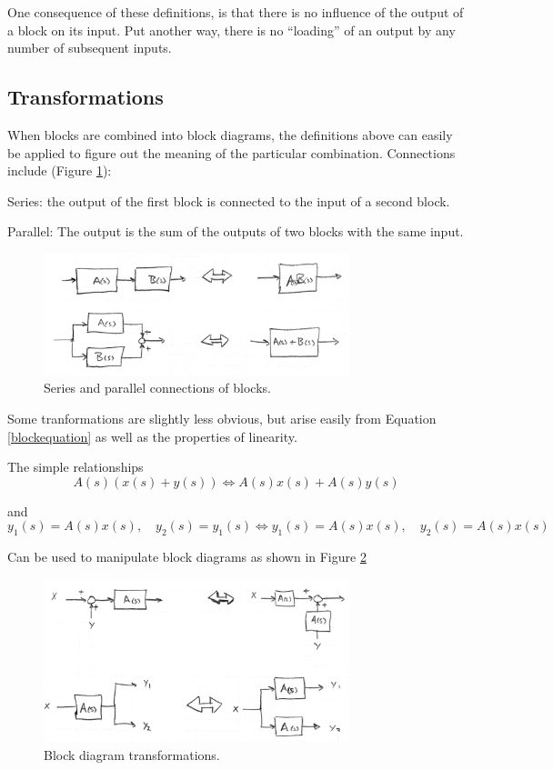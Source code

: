 One consequence of these definitions, is that there is no influence of the output of a block on its input.
Put another way, there is no ``loading'' of an output by any number of subsequent inputs.


\subsection{Transformations}

When blocks are combined into block diagrams, the definitions above can easily be applied to figure out the meaning of the particular combination.  Connections include (Figure \ref{serialparallelblocks}):

Series: the output of the first block is connected to the input of a second block.

Parallel:  The output is the sum of the outputs of two blocks with the same input.

\begin{figure}\centering
\includegraphics[width=3.5in]{figs06/00767a.png}
\caption{Series and parallel connections of blocks.}\label{serialparallelblocks}
\end{figure}

Some tranformations are slightly less obvious, but arise easily from Equation \ref{blockequation} as well as the properties of linearity.

The simple relationships
\[
A(s) \left ( x(s)+ y(s) \right) \Leftrightarrow A(s)x(s) + A(s) y(s)
\]

and
\[
y_1(s) = A(s) x(s), \quad y_2(s) = y_1(s)  \Leftrightarrow  y_1(s) = A(s)x(s), \quad y_2(s) = A(s)x(s)
\]

Can be used to manipulate block diagrams as shown in Figure \ref{blocktransforms}

\begin{figure}\centering
\includegraphics[width=3.5in]{figs06/00768a.png}
\caption{Block diagram transformations.}\label{blocktransforms}
\end{figure}

